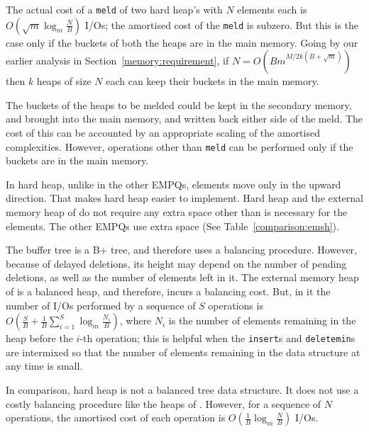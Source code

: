 The actual cost of a {\tt meld} of two hard heap's with $N$ elements each is
$O(\sqrt{m}\log_{m}\frac{N}{B})$ I/Os; the amortised cost of the {\tt meld} is subzero.
But this is the case only if the buckets of
both the heaps are in the main memory. Going by our earlier analysis in Section~\ref{memory:requirement},
if $N=O(Bm^{M/2k(B+\sqrt{m})})$ then $k$ heaps of size $N$ each can keep their buckets in the main memory.

The buckets of the heaps to be melded could be kept in the secondary memory, 
and brought into the main memory, and written back either side of the meld. 
The cost of this can be accounted
by an appropriate scaling of the amortised complexities.
However, operations other than {\tt meld} can be performed only if the buckets are 
in the main memory.
 
In hard heap, unlike in the other EMPQs, 
elements move only in the upward direction. 
That makes hard heap easier to implement.
Hard heap and the external memory heap of \cite{FJKT99} do not require any extra space
other than is necessary for the elements.
The other EMPQs \cite{Arge03,KS96} use extra space (See Table~\ref{comparison:emsh}).
  
The buffer tree \cite{Arge03} is a B+ tree, and therefore uses a balancing procedure.
However, because of delayed deletions, its height may depend on the number of pending
deletions, as well as the number of elements left in it.
The external memory heap of \cite{FJKT99} is a balanced heap, and therefore,
incurs a balancing cost. But, in it the number of
I/Os performed by a sequence of $S$ operations is
$O(\frac{S}{B}+\frac{1}{B}\sum_{i = 1}^{S} \log_{m}\frac{N_i}{B})$, where $N_i$ is the number
of elements remaining in the heap before the $i$-th operation; this is helpful
when the {\tt insert}s and {\tt deletemin}s are intermixed so that the number
of elements remaining in the data structure at any time is small.  

In comparison, hard heap is not a balanced tree data structure. It does not use a costly
balancing procedure like the heaps of \cite{FJKT99,KS96}.
However, for a sequence of $N$ operations, 
	the amortised cost of each operation is $O(\frac{1}{B} \log_m \frac{N}{B})$ I/Os.


